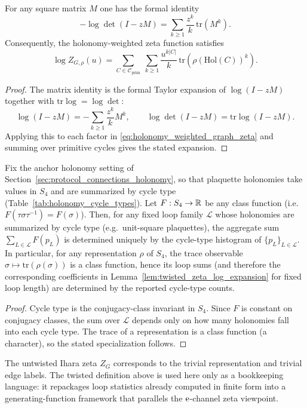 \begin{lemma}
\label{lem:twisted_zeta_log_expansion}
\MathTag For any square matrix $M$ one has the formal identity
\[
-\log\det(I-zM)=\sum_{k\ge 1}\frac{z^k}{k}\,\mathrm{tr}(M^k).
\]
Consequently, the holonomy-weighted zeta function satisfies
\[
\log Z_{G,\rho}(u)=\sum_{C\in\mathcal{C}_{\mathrm{prim}}}\ \sum_{k\ge 1}\frac{u^{k|C|}}{k}\,\mathrm{tr}\!\left(\rho(\mathrm{Hol}(C))^k\right).
\]
\end{lemma}
\begin{proof}
The matrix identity is the formal Taylor expansion of $\log(I-zM)$ together with $\mathrm{tr}\log=\log\det$:
\[
\log(I-zM)=-\sum_{k\ge 1}\frac{z^k}{k}M^k,
\qquad
\log\det(I-zM)=\mathrm{tr}\log(I-zM).
\]
Applying this to each factor in \eqref{eq:holonomy_weighted_graph_zeta} and summing over primitive cycles gives the stated expansion.
\end{proof}

\begin{proposition}\label{prop:cycle_type_stats_determine_class_sums}
\MathTag Fix the anchor holonomy setting of Section~\ref{sec:protocol_connections_holonomy}, so that plaquette holonomies take values in $S_4$ and are summarized by cycle type (Table~\ref{tab:holonomy_cycle_types}).
Let $F:S_4\to\mathbb{R}$ be any class function (i.e.\ $F(\tau\sigma\tau^{-1})=F(\sigma)$).
Then, for any fixed loop family $\mathcal{L}$ whose holonomies are summarized by cycle type (e.g.\ unit-square plaquettes),
the aggregate sum $\sum_{L\in\mathcal{L}} F(p_L)$ is determined uniquely by the cycle-type histogram of $\{p_L\}_{L\in\mathcal{L}}$.
In particular, for any representation $\rho$ of $S_4$, the trace observable $\sigma\mapsto \mathrm{tr}(\rho(\sigma))$ is a class function, hence its loop sums (and therefore the corresponding coefficients in Lemma~\ref{lem:twisted_zeta_log_expansion} for fixed loop length) are determined by the reported cycle-type counts.
\end{proposition}
\begin{proof}
Cycle type is the conjugacy-class invariant in $S_4$.
Since $F$ is constant on conjugacy classes, the sum over $\mathcal{L}$ depends only on how many holonomies fall into each cycle type.
The trace of a representation is a class function (a character), so the stated specialization follows.
\end{proof}

\AuditTag The untwisted Ihara zeta $Z_G$ corresponds to the trivial representation and trivial edge labels.
The twisted definition above is used here only as a bookkeeping language: it repackages loop statistics already computed in finite form into a generating-function framework that parallels the $\mathrm{e}$-channel zeta viewpoint.


